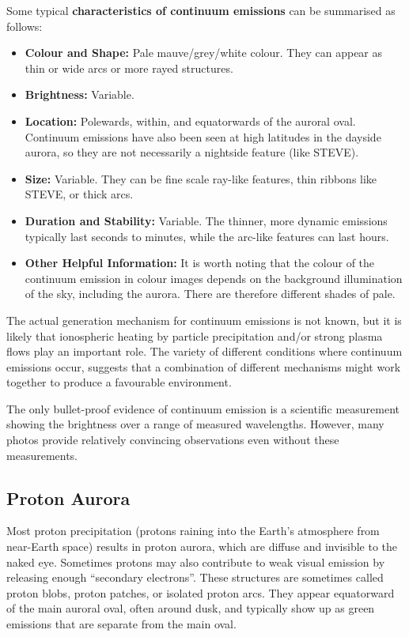 \documentclass{article}
\newcommand{\contributed}[1]{%
    \par\noindent
    \begingroup
    \setlength{\leftskip}{1em}%
    \itshape
    Contributors: #1
    \par
    \endgroup
    \vspace{0.5em}
}
\begin{document}
Some typical {\bf characteristics of continuum emissions} can be summarised as follows:
\begin{itemize}
    \item \textbf{Colour and Shape:} Pale mauve/grey/white colour. They can appear as thin or wide arcs or more rayed structures.
    \item \textbf{Brightness:} Variable.
    \item \textbf{Location:} Polewards, within, and equatorwards of the auroral oval. Continuum emissions have also been seen at high latitudes in the dayside aurora, so they are not necessarily a nightside feature (like STEVE).
    \item \textbf{Size:} Variable. They can be fine scale ray-like features, thin ribbons like STEVE, or thick arcs.
    \item \textbf{Duration and Stability:} Variable. The thinner, more dynamic emissions typically last seconds to minutes, while the arc-like features can last hours.
    \item \textbf{Other Helpful Information:} It is worth noting that the colour of the continuum emission in colour images depends on the background illumination of the sky, including the aurora. There are therefore different shades of pale.
    \end{itemize}


The actual generation mechanism for continuum emissions is not known, but it is likely that ionospheric heating by particle precipitation and/or strong plasma flows play an important role. The variety of different conditions where continuum emissions occur, suggests that a combination of different mechanisms might work together to produce a favourable environment.

The only bullet-proof evidence of continuum emission is a scientific measurement showing the brightness over a range of measured wavelengths. However, many photos provide relatively convincing observations even without these measurements. 


\subsection{Proton Aurora}\label{Proton Aurora}

Most proton precipitation (protons raining into the Earth's atmosphere from near-Earth space) results in proton aurora, which are diffuse and invisible to the naked eye. Sometimes protons may also contribute to weak visual emission by releasing enough ``secondary electrons''. These structures are sometimes called proton blobs, proton patches, or isolated proton arcs. They  appear equatorward of the main auroral oval, often around dusk, and typically show up as green emissions that are separate from the main oval.
\end{document}
